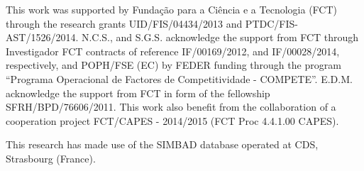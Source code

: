 \documentclass{aa}
\begin{document}
\begin{acknowledgements}

This work was supported by Funda\c{c}\~ao para a Ci\^encia e a Tecnologia (FCT)
through the research grants UID/FIS/04434/2013 and PTDC/FIS-AST/1526/2014.
N.C.S., and S.G.S. acknowledge the support from FCT through Investigador FCT
contracts of reference IF/00169/2012, and IF/00028/2014, respectively, and
POPH/FSE (EC) by FEDER funding through the program “Programa Operacional de
Factores de Competitividade - COMPETE”. E.D.M. acknowledge the support from FCT
in form of the fellowship SFRH/BPD/76606/2011. This work also benefit from the
collaboration of a cooperation project FCT/CAPES - 2014/2015 (FCT Proc 4.4.1.00
CAPES).

This research has made use of the SIMBAD database operated at CDS, Strasbourg
(France).

\end{acknowledgements}




\end{document}
